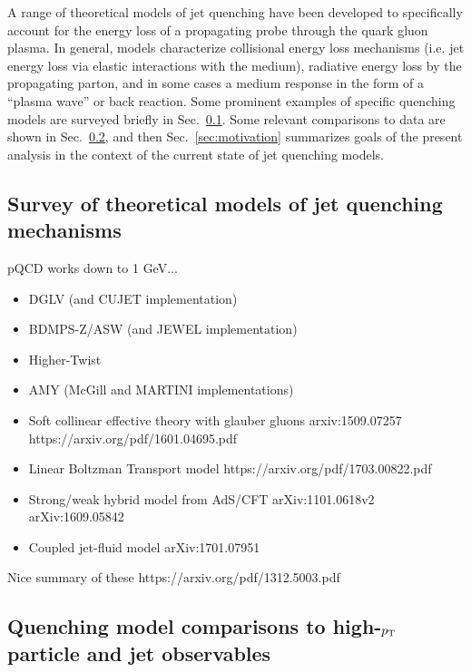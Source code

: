 A range of theoretical models of jet quenching have been developed to specifically account for the energy loss of a propagating probe through the quark gluon plasma.  In general, models characterize collisional energy loss mechanisms (i.e. jet energy loss via elastic interactions with the medium), radiative energy loss by the propagating parton, and in some cases a medium response in the form of a ``plasma wave'' or back reaction.  Some prominent examples of specific quenching models are surveyed briefly in Sec.~\ref{sec:model_survey}.  Some relevant comparisons to data are shown in Sec.~\ref{sec:model_comparison}, and then Sec.~\ref{sec:motivation} summarizes goals of the present analysis in the context of the current state of jet quenching models. 

\subsection{Survey of theoretical models of jet quenching mechanisms}
\label{sec:model_survey}

pQCD works down to 1 GeV...

\begin{itemize}

\item DGLV (and CUJET implementation)
\item BDMPS-Z/ASW (and JEWEL implementation)
\item Higher-Twist
\item AMY (McGill and MARTINI implementations)
\item Soft collinear effective theory with glauber gluons
arxiv:1509.07257
https://arxiv.org/pdf/1601.04695.pdf

\item Linear Boltzman Transport model
https://arxiv.org/pdf/1703.00822.pdf

\item Strong/weak hybrid model from AdS/CFT
arXiv:1101.0618v2
arXiv:1609.05842

\item Coupled jet-fluid model
 arXiv:1701.07951


\end{itemize}

Nice summary of these
https://arxiv.org/pdf/1312.5003.pdf

\subsection{Quenching model comparisons to high-$p_{\rm T}$ particle and jet observables}
\label{sec:model_comparison}

